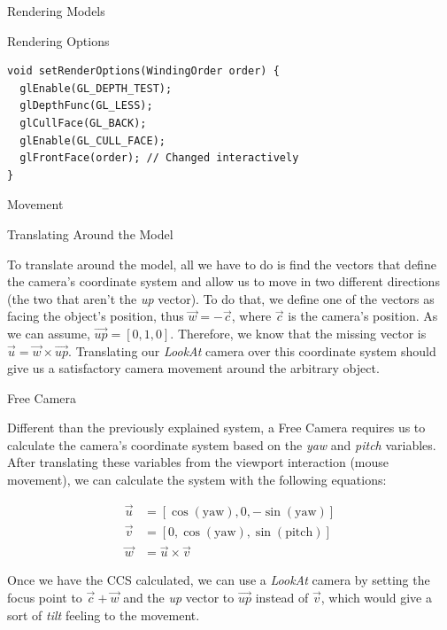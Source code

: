 \documentclass{article}
\begin{document}
\begin{multicols}{2}
\begin{section}{Rendering Models}
\begin{subsection}{Rendering Options}
\begin{verbatim}
void setRenderOptions(WindingOrder order) {
  glEnable(GL_DEPTH_TEST);
  glDepthFunc(GL_LESS);
  glCullFace(GL_BACK);
  glEnable(GL_CULL_FACE);
  glFrontFace(order); // Changed interactively
}
  \end{verbatim}

  \end{subsection}
\end{section}

\begin{section}{Movement}
  \begin{subsection}{Translating Around the Model}

    To translate around the model, all we have to do is find the vectors that define
the camera's coordinate system and allow us to move in two different directions
(the two that aren't the \textit{up} vector). To do that, we define one of the
vectors as facing the object's position, thus $\vec{w} = - \vec{c}$, where
$\vec{c}$ is the camera's position. As we can assume, $\overrightarrow{up} = [0, 1,0]$.
Therefore, we know that the missing vector is $\vec{u} = \vec{w} \times
\overrightarrow{up}$. Translating our \textit{LookAt} camera over this
coordinate system should give us a satisfactory camera movement around the arbitrary
object.

  \end{subsection}

  \begin{subsection}{Free Camera}

    Different than the previously explained system, a Free Camera requires us to
calculate the camera's coordinate system based on the \textit{yaw} and
\textit{pitch} variables. After translating these variables from the viewport
interaction (mouse movement), we can calculate the system with the following
equations:

  \begin{align*}
    \vec{u} &= [\cos(\text{yaw}), 0, -\sin(\text{yaw})] \\ 
    \vec{v} &= [0, \cos(\text{yaw}), \sin(\text{pitch})] \\
    \vec{w} &= \vec{u} \times \vec{v}
  \end{align*}

  Once we have the CCS calculated, we can use a \textit{LookAt} camera by
setting the focus point to $\vec{c} + \vec{w}$ and the \textit{up} vector to
$\overrightarrow{up}$ instead of $\vec{v}$, which would give a sort of
\textit{tilt} feeling to the movement.

  \end{subsection}
\end{section}

\end{multicols}
\end{document}

